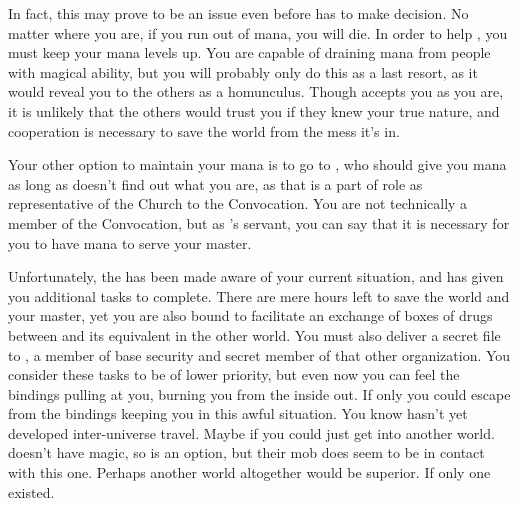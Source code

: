 \documentclass[char]{guildcamp3}
\begin{document}
	In fact, this may prove to be an issue even before \cNobleOne{} has to make \cNobleOne{\their} decision. No matter where you are, if you run out of mana, you will die. In order to help \cNobleOne{}, you must keep your mana levels up. You are capable of draining mana from people with magical ability, but you will probably only do this as a last resort, as it would reveal you to the others as a homunculus. Though \cNobleOne{} accepts you as you are, it is unlikely that the others would trust you if they knew your true nature, and cooperation is necessary to save the world from the mess it's in.
	
	Your other option to maintain your mana is to go to \cPaladin{}, who should give you mana as long as \cPaladin{\they} doesn't find out what you are, as that is a part of \cPaladin{\their} role as representative of the Church to the Convocation. You are not technically a member of the Convocation, but as \cNobleOne{}'s servant, you can say that it is necessary for you to have mana to serve your master.
	
	Unfortunately, the \bMagicMob{} has been made aware of your current situation, and has given you additional tasks to complete. There are mere hours left to save the world and your master, yet you are also bound to facilitate an exchange of boxes of drugs between \bMagicMob{} and its equivalent in the other world. You must also deliver a secret file to \cSpecOpTwo{}, a member of base security and secret member of that other organization. You consider these tasks to be of lower priority, but even now you can feel the bindings pulling at you, burning you from the inside out. If only you could escape from the bindings keeping you in this awful situation. You know \bMagicMob{} hasn't yet developed inter-universe travel. Maybe if you could just get into another world. \bTechWorld{} doesn't have magic, so is an option, but their mob does seem to be in contact with this one. Perhaps another world altogether would be superior. If only one existed. 
\end{document}
